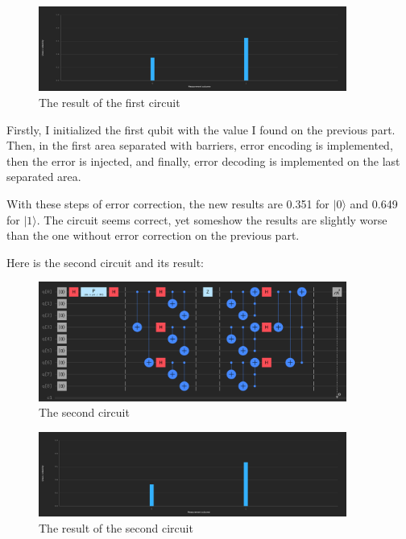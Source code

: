 \documentclass[12pt]{article}
\begin{document}
\begin{figure}[H]
    \centering
    \includegraphics[width=0.9\textwidth]{shor1R.png}
    \caption{The result of the first circuit}
\end{figure}

Firstly, I initialized the first qubit with the value I found on the previous part. Then, in the first area separated with barriers, error encoding is implemented, then the error is injected, and finally, error decoding is implemented on the last separated area.

With these steps of error correction, the new results are 0.351 for $ |0\rangle $ and 0.649 for $ |1\rangle $. The circuit seems correct, yet someshow the results are slightly worse than the one without error correction on the previous part.

\newpage

Here is the second circuit and its result:

\begin{figure}[H]
    \centering
    \includegraphics[width=0.9\textwidth]{shor2.png}
    \caption{The second circuit}
\end{figure}

\begin{figure}[H]
    \centering
    \includegraphics[width=0.9\textwidth]{shor2R.png}
    \caption{The result of the second circuit}
\end{figure}
\end{document}

